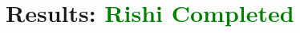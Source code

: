 \documentclass[a4paper]{article}
\newcommand{\toshi}{\textcolor{teal}}
\newcommand{\laurie}{\textcolor{red}}
\newcommand{\rishi}{\textcolor{green}}
\begin{document}
\newpage
\tableofcontents 



\newpage    
\begin{abstract}
\end{abstract}

\newpage

 

\section{Results: \rishi{Rishi Completed}}
\end{document}

